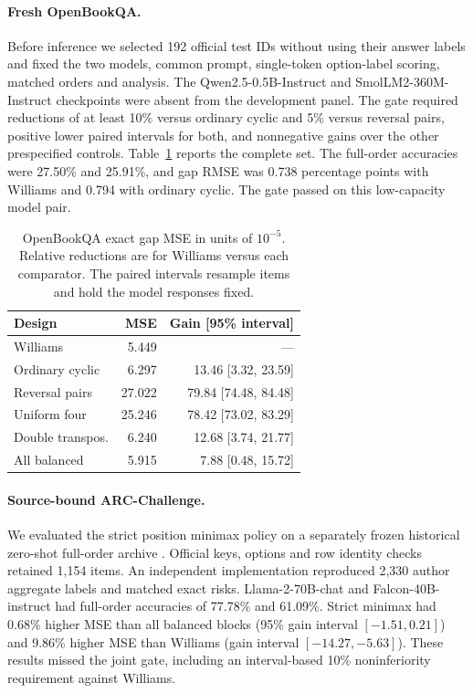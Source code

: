 \paragraph{Fresh OpenBookQA.}
Before inference we selected 192 official test IDs \citep{mihaylov2018} without using their
answer labels and fixed the two models, common prompt, single-token
option-label scoring, matched orders and analysis. The Qwen2.5-0.5B-Instruct
and SmolLM2-360M-Instruct checkpoints were absent from the development
panel. The gate required reductions of at least 10\% versus ordinary cyclic
and 5\% versus reversal pairs, positive lower paired intervals for both,
and nonnegative gains over the other prespecified controls.
Table~\ref{tab:obqa} reports the complete set. The full-order accuracies
were 27.50\% and 25.91\%, and gap RMSE was 0.738 percentage points with
Williams and 0.794 with ordinary cyclic. The gate passed on this
low-capacity model pair.

\begin{table}[t]
\caption{OpenBookQA exact gap MSE in units of $10^{-5}$. Relative
reductions are for Williams versus each comparator. The paired intervals
resample items and hold the model responses fixed.}
\label{tab:obqa}
\centering
\small
\setlength{\tabcolsep}{4pt}
\begin{tabular}{@{}lrr@{}}
\toprule
Design & MSE & Gain [95\% interval] \\
\midrule
Williams & 5.449 & --- \\
Ordinary cyclic & 6.297 & 13.46 [3.32, 23.59] \\
Reversal pairs & 27.022 & 79.84 [74.48, 84.48] \\
Uniform four & 25.246 & 78.42 [73.02, 83.29] \\
Double transpos. & 6.240 & 12.68 [3.74, 21.77] \\
All balanced & 5.915 & 7.88 [0.48, 15.72] \\
\bottomrule
\end{tabular}
\end{table}

\paragraph{Source-bound ARC-Challenge.}
We evaluated the strict position minimax policy on a separately frozen
historical zero-shot full-order archive \citep{zheng2024,clark2018}.
Official keys, options and row identity checks retained 1,154 items.
An independent implementation reproduced 2,330 author aggregate labels
and matched exact risks. Llama-2-70B-chat and Falcon-40B-instruct had full-order accuracies of
77.78\% and 61.09\%. Strict minimax had 0.68\% higher MSE than all balanced
blocks (95\% gain interval $[-1.51,0.21]$) and 9.86\% higher MSE than
Williams (gain interval $[-14.27,-5.63]$). These results missed the
joint gate, including an interval-based 10\% noninferiority requirement
against Williams.

